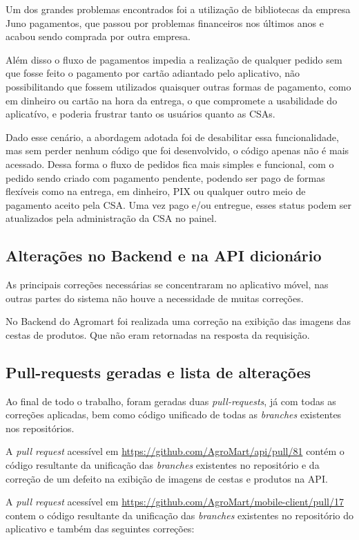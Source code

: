 Um dos grandes problemas encontrados foi a utilização de bibliotecas da empresa Juno pagamentos, que passou por problemas financeiros nos últimos anos e acabou sendo comprada por outra empresa.

Além disso o fluxo de pagamentos impedia a realização de qualquer pedido sem que fosse feito o pagamento por cartão adiantado pelo aplicativo, não possibilitando que fossem utilizados quaisquer outras formas de pagamento, como em dinheiro ou cartão na hora da entrega, o que compromete a usabilidade do aplicatívo, e poderia frustrar tanto os usuários quanto as CSAs.

Dado esse cenário, a abordagem adotada foi de desabilitar essa funcionalidade, mas sem perder nenhum código que foi desenvolvido, o código apenas não é mais acessado. Dessa forma o fluxo de pedidos fica mais simples e funcional, com o pedido sendo criado com pagamento pendente, podendo ser pago de formas flexíveis como na entrega, em dinheiro, PIX ou qualquer outro meio de pagamento aceito pela CSA. Uma vez pago e/ou entregue, esses status podem ser atualizados pela administração da CSA no painel.

\subsection{Alterações no Backend e na API dicionário}
As principais correções necessárias se concentraram no aplicativo móvel, nas outras partes do sistema não houve a necessidade de muitas correções.

No Backend do Agromart foi realizada uma correção na exibição das imagens das cestas de produtos. Que não eram retornadas na resposta da requisição.

\subsection{Pull-requests geradas e lista de alterações}

Ao final de todo o trabalho, foram geradas duas \textit{pull-requests}, já com todas as correções aplicadas, bem como código unificado de todas as \textit{branches} existentes nos repositórios.

A \textit{pull request} acessível em \url{https://github.com/AgroMart/api/pull/81} contém o código resultante da unificação das \textit{branches} existentes no repositório e da correção de um defeito na exibição de imagens de cestas e produtos na API.

A \textit{pull request} acessível em \url{https://github.com/AgroMart/mobile-client/pull/17} contem o código resultante da unificação das \textit{branches} existentes no repositório do aplicativo e também das seguintes correções: 

